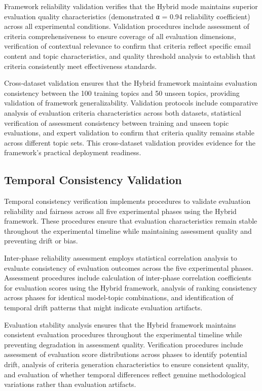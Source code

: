 Framework reliability validation verifies that the Hybrid mode maintains superior evaluation quality characteristics (demonstrated α = 0.94 reliability coefficient) across all experimental conditions. Validation procedures include assessment of criteria comprehensiveness to ensure coverage of all evaluation dimensions, verification of contextual relevance to confirm that criteria reflect specific email content and topic characteristics, and quality threshold analysis to establish that criteria consistently meet effectiveness standards.

Cross-dataset validation ensures that the Hybrid framework maintains evaluation consistency between the 100 training topics and 50 unseen topics, providing validation of framework generalizability. Validation protocols include comparative analysis of evaluation criteria characteristics across both datasets, statistical verification of assessment consistency between training and unseen topic evaluations, and expert validation to confirm that criteria quality remains stable across different topic sets. This cross-dataset validation provides evidence for the framework's practical deployment readiness.

\subsection{Temporal Consistency Validation}

Temporal consistency verification implements procedures to validate evaluation reliability and fairness across all five experimental phases using the Hybrid framework. These procedures ensure that evaluation characteristics remain stable throughout the experimental timeline while maintaining assessment quality and preventing drift or bias.

Inter-phase reliability assessment employs statistical correlation analysis to evaluate consistency of evaluation outcomes across the five experimental phases. Assessment procedures include calculation of inter-phase correlation coefficients for evaluation scores using the Hybrid framework, analysis of ranking consistency across phases for identical model-topic combinations, and identification of temporal drift patterns that might indicate evaluation artifacts.

Evaluation stability analysis ensures that the Hybrid framework maintains consistent evaluation procedures throughout the experimental timeline while preventing degradation in assessment quality. Verification procedures include assessment of evaluation score distributions across phases to identify potential drift, analysis of criteria generation characteristics to ensure consistent quality, and evaluation of whether temporal differences reflect genuine methodological variations rather than evaluation artifacts.


